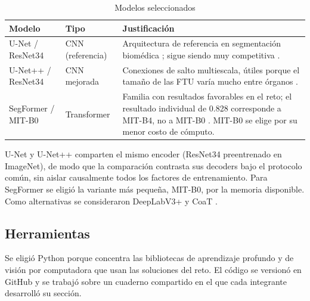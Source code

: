 \documentclass[11pt,letterpaper]{article}
\begin{document}
\begin{table}[H]
\centering
\caption{Modelos seleccionados}
\begin{tabular}{llp{8.2cm}}
\toprule
\textbf{Modelo} & \textbf{Tipo} & \textbf{Justificación} \\
\midrule
U-Net / ResNet34    & CNN (referencia) & Arquitectura de referencia en segmentación biomédica
  \parencite{ronneberger2015unet,siddique2021unet}; sigue siendo muy competitiva
  \parencite{isensee2021nnunet}. \\
U-Net++ / ResNet34  & CNN mejorada & Conexiones de salto multiescala, útiles porque el tamaño de las
  FTU varía mucho entre órganos \parencite{zhou2020unetpp}. \\
SegFormer / MIT-B0  & Transformer & Familia con resultados favorables en el reto; el resultado
  individual de 0.828 corresponde a MIT-B4, no a MIT-B0 \parencite{jain2023hacking,xie2021segformer}.
  MIT-B0 se elige por su menor costo de cómputo. \\
\bottomrule
\end{tabular}
\end{table}

U-Net y U-Net++ comparten el mismo encoder (ResNet34 preentrenado en ImageNet), de modo que la
comparación contrasta sus decoders bajo el protocolo común, sin aislar causalmente todos los factores
de entrenamiento. Para SegFormer se eligió la variante más pequeña,
MIT-B0, por la memoria disponible. Como alternativas se consideraron DeepLabV3+
\parencite{chen2018deeplabv3plus} y CoaT \parencite{xu2021coat}.

\subsection{Herramientas}

Se eligió Python porque concentra las bibliotecas de aprendizaje profundo y de visión por computadora
que usan las soluciones del reto. El código se versionó en GitHub y se trabajó sobre un cuaderno
compartido en el que cada integrante desarrolló su sección.
\end{document}
